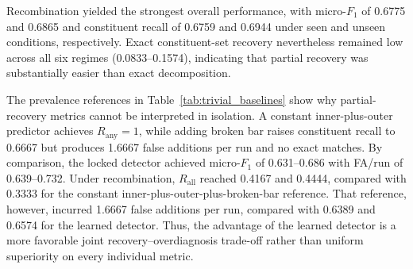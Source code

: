 \documentclass{ieeeaccess}
\begin{document}
Recombination yielded the strongest overall performance, with micro-$F_1$ of
0.6775 and 0.6865 and constituent recall of 0.6759 and 0.6944 under seen and
unseen conditions, respectively. Exact constituent-set recovery nevertheless
remained low across all six regimes (0.0833--0.1574), indicating that partial
recovery was substantially easier than exact decomposition.

The prevalence references in Table~\ref{tab:trivial_baselines} show why
partial-recovery metrics cannot be interpreted in isolation. A constant
inner-plus-outer predictor achieves $R_{\mathrm{any}}=1$, while adding broken
bar raises constituent recall to 0.6667 but produces 1.6667 false additions
per run and no exact matches. By comparison, the locked detector achieved micro-$F_1$ of 0.631--0.686 with
FA/run of 0.639--0.732. Under recombination, $R_{\mathrm{all}}$ reached
0.4167 and 0.4444, compared with 0.3333 for the constant
inner-plus-outer-plus-broken-bar reference. That reference, however, incurred
1.6667 false additions per run, compared with 0.6389 and 0.6574 for the
learned detector. Thus, the advantage of the learned detector is a more
favorable joint recovery--overdiagnosis trade-off rather than uniform
superiority on every individual metric. 
\end{document}
